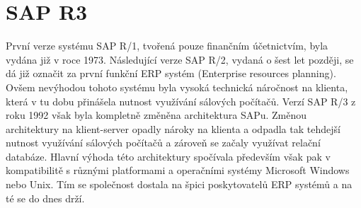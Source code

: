 \documentclass[thesis=M,czech]{FITthesis}[2012/06/26]
\begin{document}
\section{SAP R3}
První verze systému SAP R/1, tvořená pouze finančním účetnictvím, byla vydána již v roce 1973. Následující verze SAP R/2, vydaná o šest let později, se dá již označit za první funkční ERP systém (Enterprise resources planning). Ovšem nevýhodou tohoto systému byla vysoká technická náročnost na klienta, která v tu dobu přinášela nutnost využívání sálových počítačů. Verzí SAP R/3 z roku 1992 však byla kompletně změněna architektura SAPu. Změnou architektury na klient-server opadly nároky na klienta a odpadla tak tehdejší nutnost využívání sálových počítačů a zároveň se začaly využívat relační databáze. Hlavní výhoda této architektury spočívala především však pak v kompatibilitě s různými platformami a operačními systémy Microsoft Windows nebo Unix. Tím se společnost dostala na špici poskytovatelů ERP systémů a na té se do dnes drží.
\end{document}

